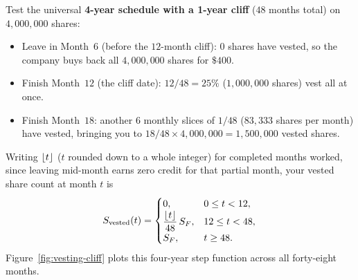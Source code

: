 Test the universal \textbf{4-year schedule with a 1-year cliff} ($48$ months total) on $4{,}000{,}000$ shares:
\begin{itemize}
  \item Leave in Month~$6$ (before the $12$-month cliff): $0$ shares have vested, so the company buys back all $4{,}000{,}000$ shares for $\$400$.
  \item Finish Month~$12$ (the cliff date): $12 / 48 = 25\%$ ($1{,}000{,}000$ shares) vest all at once.
  \item Finish Month~$18$: another $6$ monthly slices of $1/48$ ($83{,}333$ shares per month) have vested, bringing you to $18 / 48 \times 4{,}000{,}000 = 1{,}500{,}000$ vested shares.
\end{itemize}
Writing $\lfloor t\rfloor$ ($t$ rounded down to a whole integer) for completed months worked, since leaving mid-month earns zero credit for that partial month, your vested share count at month $t$ is
\begin{equation}\label{eq:vesting-schedule}
  S_{\text{vested}}(t) =
  \begin{cases}
    0, & 0 \le t < 12, \\
    \dfrac{\lfloor t\rfloor}{48}\,S_F, & 12 \le t < 48, \\
    S_F, & t \ge 48.
  \end{cases}
\end{equation}
Figure~\ref{fig:vesting-cliff} plots this four-year step function across all forty-eight months.

